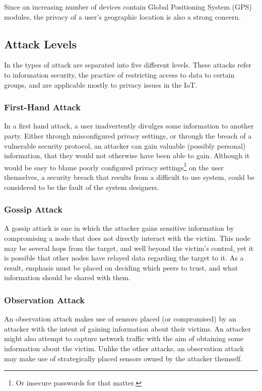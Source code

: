 \documentclass[10pt,journal,compsoc]{IEEEtran}
\begin{document}
Since an increasing number of devices contain Global Positioning System (GPS)
modules, the privacy of a user's geographic location is also a strong concern.

\subsection{Attack Levels}
In \cite{Elkhodr2013} the types of attack are separated into five different
levels. These attacks refer to information security, the practice of
restricting access to data to certain groups, and are applicable mostly to
privacy issues in the IoT.

\subsubsection{First-Hand Attack}
In a first hand attack, a user inadvertently divulges some information to
another party. Either through misconfigured privacy settings, or through the
breach of a vulnerable security protocol, an attacker can gain valuable
(possibly personal) information, that they would not otherwise have been able
to gain. Although it would be easy to blame poorly configured privacy
settings\footnote{Or insecure passwords for that matter.} on the user
themselves, a security breach that results from a difficult to use system,
could be considered to be the fault of the system designers. 

\subsubsection{Gossip Attack}
A gossip attack is one in which the attacker gains sensitive information by
compromising a node that does not directly interact with the victim. This node
may be several hops from the target, and well beyond the victim's control, yet
it is possible that other nodes have relayed data regarding the target to it.
As a result, emphasis must be placed on deciding which peers to trust, and what
information should be shared with them.

\subsubsection{Observation Attack}
An observation attack makes use of sensors placed (or compromised) by an
attacker with the intent of gaining information about their victims. An
attacker might also attempt to capture network traffic with the aim of
obtaining some information about the victim. Unlike the other attacks, an
observation attack may make use of strategically placed sensors owned by the
attacker themself.
\end{document}
